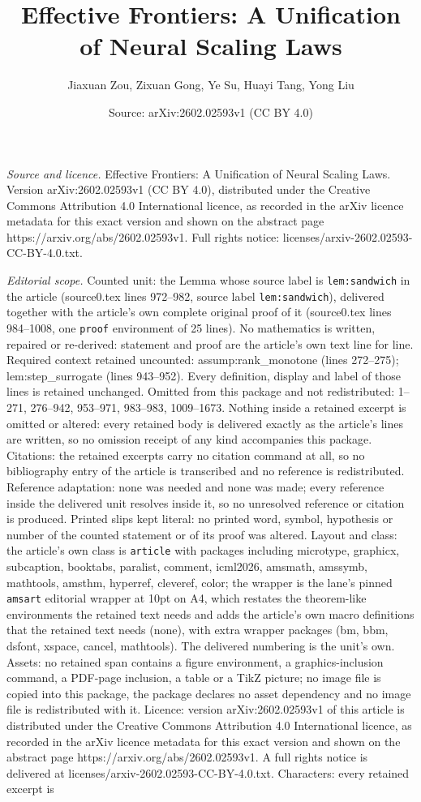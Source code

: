 \documentclass[10pt,a4paper]{amsart}
\title[Effective Frontiers: A Unification of Neural Scaling Laws]{Effective Frontiers: A Unification of Neural Scaling Laws}
\author{Jiaxuan Zou, Zixuan Gong, Ye Su, Huayi Tang, Yong Liu}
\date{Source: arXiv:2602.02593v1 (CC BY 4.0)}
\begin{document}
\maketitle

\noindent\emph{Source and licence.} Effective Frontiers: A Unification of Neural Scaling Laws. Version arXiv:2602.02593v1 (CC BY 4.0), distributed under the Creative Commons Attribution 4.0 International licence, as recorded in the arXiv licence metadata for this exact version and shown on the abstract page https://arxiv.org/abs/2602.02593v1. Full rights notice: licenses/arxiv-2602.02593-CC-BY-4.0.txt.\par\smallskip

\noindent\textit{Editorial scope.} Counted unit: the Lemma whose source label is \texttt{lem:sandwich} in the article (source0.tex lines 972--982, source label \texttt{lem:sandwich}), delivered together with the article's own complete original proof of it (source0.tex lines 984--1008, one \texttt{proof} environment of 25 lines). No mathematics is written, repaired or re-derived: statement and proof are the article's own text line for line. Required context retained uncounted: assump:rank\_monotone (lines 272--275); lem:step\_surrogate (lines 943--952). Every definition, display and label of those lines is retained unchanged. Omitted from this package and not redistributed: 1--271, 276--942, 953--971, 983--983, 1009--1673. Nothing inside a retained excerpt is omitted or altered: every retained body is delivered exactly as the article's lines are written, so no omission receipt of any kind accompanies this package. Citations: the retained excerpts carry no citation command at all, so no bibliography entry of the article is transcribed and no reference is redistributed. Reference adaptation: none was needed and none was made; every reference inside the delivered unit resolves inside it, so no unresolved reference or citation is produced. Printed slips kept literal: no printed word, symbol, hypothesis or number of the counted statement or of its proof was altered. Layout and class: the article's own class is \texttt{article} with packages including microtype, graphicx, subcaption, booktabs, paralist, comment, icml2026, amsmath, amssymb, mathtools, amsthm, hyperref, cleveref, color; the wrapper is the lane's pinned \texttt{amsart} editorial wrapper at 10pt on A4, which restates the theorem-like environments the retained text needs and adds the article's own macro definitions that the retained text needs (none), with extra wrapper packages (bm, bbm, dsfont, xspace, cancel, mathtools). The delivered numbering is the unit's own. Assets: no retained span contains a figure environment, a graphics-inclusion command, a PDF-page inclusion, a table or a TikZ picture; no image file is copied into this package, the package declares no asset dependency and no image file is redistributed with it. Licence: version arXiv:2602.02593v1 of this article is distributed under the Creative Commons Attribution 4.0 International licence, as recorded in the arXiv licence metadata for this exact version and shown on the abstract page https://arxiv.org/abs/2602.02593v1. A full rights notice is delivered at licenses/arxiv-2602.02593-CC-BY-4.0.txt. Characters: every retained excerpt is 
\end{document}
